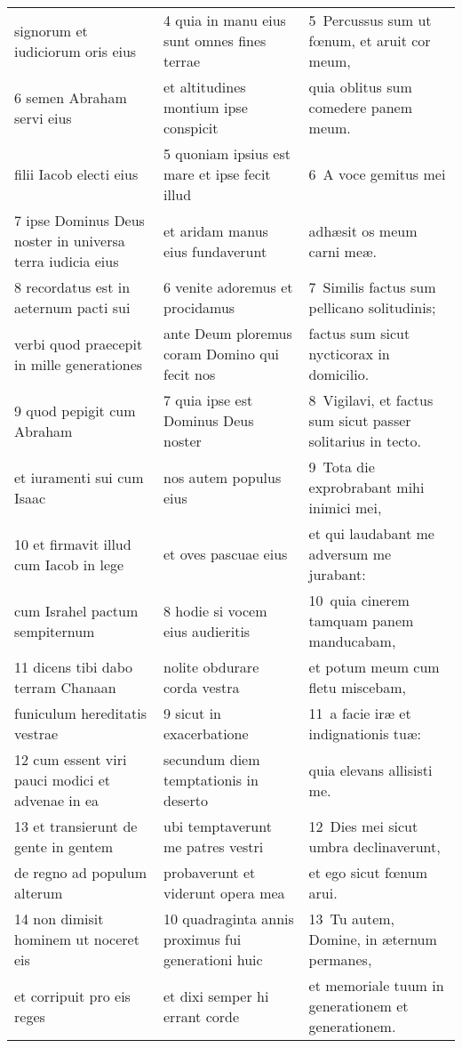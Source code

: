\documentclass{article}
\begin{document}
\begin{longtable}{@{}p{}p{}p{}@{}}
signorum et iudiciorum oris eius	&	4 quia in manu eius sunt omnes fines terrae	&	5 Percussus sum ut fœnum, et aruit cor meum,	\\
6 semen Abraham servi eius	&	et altitudines montium ipse conspicit	&	quia oblitus sum comedere panem meum.	\\
filii Iacob electi eius	&	5 quoniam ipsius est mare et ipse fecit illud	&	6 A voce gemitus mei	\\
7 ipse Dominus Deus noster in universa terra iudicia eius	&	et aridam manus eius fundaverunt	&	adhæsit os meum carni meæ.	\\
8 recordatus est in aeternum pacti sui	&	6 venite adoremus et procidamus	&	7 Similis factus sum pellicano solitudinis;	\\
verbi quod praecepit in mille generationes	&	ante Deum ploremus coram Domino qui fecit nos	&	factus sum sicut nycticorax in domicilio.	\\
9 quod pepigit cum Abraham	&	7 quia ipse est Dominus Deus noster	&	8 Vigilavi, et factus sum sicut passer solitarius in tecto.	\\
et iuramenti sui cum Isaac	&	nos autem populus eius	&	9 Tota die exprobrabant mihi inimici mei,	\\
10 et firmavit illud cum Iacob in lege	&	et oves pascuae eius	&	et qui laudabant me adversum me jurabant:	\\
cum Israhel pactum sempiternum	&	8 hodie si vocem eius audieritis	&	10 quia cinerem tamquam panem manducabam,	\\
11 dicens tibi dabo terram Chanaan	&	nolite obdurare corda vestra	&	et potum meum cum fletu miscebam,	\\
funiculum hereditatis vestrae	&	9 sicut in exacerbatione	&	11 a facie iræ et indignationis tuæ:	\\
12 cum essent viri pauci modici et advenae in ea	&	secundum diem temptationis in deserto	&	quia elevans allisisti me.	\\
13 et transierunt de gente in gentem	&	ubi temptaverunt me patres vestri	&	12 Dies mei sicut umbra declinaverunt,	\\
de regno ad populum alterum	&	probaverunt et viderunt opera mea	&	et ego sicut fœnum arui.	\\
14 non dimisit hominem ut noceret eis	&	10 quadraginta annis proximus fui generationi huic	&	13 Tu autem, Domine, in æternum permanes,	\\
et corripuit pro eis reges	&	et dixi semper hi errant corde	&	et memoriale tuum in generationem et generationem.	\\

\end{longtable}
\end{document}
